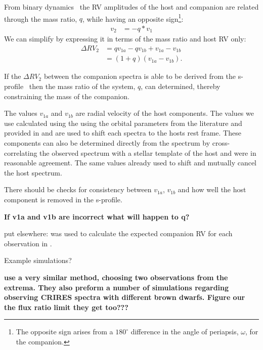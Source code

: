 From binary dynamics~\citep[e.g.][]{murray_keplerian_2010} the {RV} amplitudes of the host and companion are related through the mass ratio, \(q\), while having an opposite sign\footnote{The opposite sign arises from a \(180^\circ\) difference in the angle of periapsis, \(\omega\), for the companion.}:
\begin{align}
v_{2} &= -q * v_{1} \label{eqn:q_relation}
\end{align}
We can simplify  by expressing it in terms of the mass ratio and host {RV} only:
\begin{align}
\Delta RV_2 &= q v_{1a} - q v_{1b} + v_{1a} - v_{1b} \nonumber \\
&= (1 + q)(v_{1a} - v_{1b}). \label{eqn:companion_difference_simplified}
\end{align}

If the \(\Delta {RV}_2\) between the companion spectra is able to be derived from the s-profile~\citep[see][]{ferluga_separating_1997} then the mass ratio of the system, \(q\), can determined, thereby constraining the mass of the companion.

The values \(v_{1a}\) and \(v_{1b}\) are radial velocity of the host components. The values we use calculated using the  using the orbital parameters from the literature and provided in  and are used to shift each spectra to the hosts rest frame. These components can also be determined directly from the spectrum by cross-correlating the observed spectrum with a stellar template of the host and were in reasonable agreement. The same values already used to shift and mutually cancel the host spectrum.

There should be checks for consistency between \(v_{1a}\), \(v_{1b}\) and how well the host component is removed in the s-profile.

\textbf{If v1a and v1b are incorrect what will happen to q?}

{\red{} put elsewhere:  was used to calculate the expected companion {RV} for each observation in .}

Example simulations?

\textbf{\citet{kostogryz_spectral_2013} use a very similar method, choosing two observations from the extrema. They also preform a number of simulations regarding observing CRIRES spectra with different brown dwarfs. Figure our the flux ratio limit they get too???}

